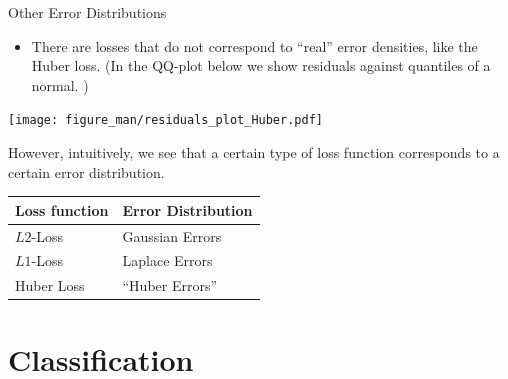 \begin{vbframe}{Other Error Distributions}

\begin{itemize}
\item There are losses that do not correspond to \enquote{real} error densities, like the Huber loss. (In the QQ-plot below we show residuals against quantiles of a normal. )
\end{itemize}

\begin{center}
\texttt{[image: figure\_man/residuals\_plot\_Huber.pdf]}
\end{center}

\framebreak 

However, intuitively, we see that a certain type of loss function corresponds to a certain error distribution. 

\begin{table}[]
\begin{tabular}{ll}
Loss function & Error Distribution \\
\hline
$L2$-Loss & Gaussian Errors \\
$L1$-Loss & Laplace Errors \\
Huber Loss & \enquote{Huber Errors}
\end{tabular}
\end{table}

\end{vbframe}


\section{Classification}


